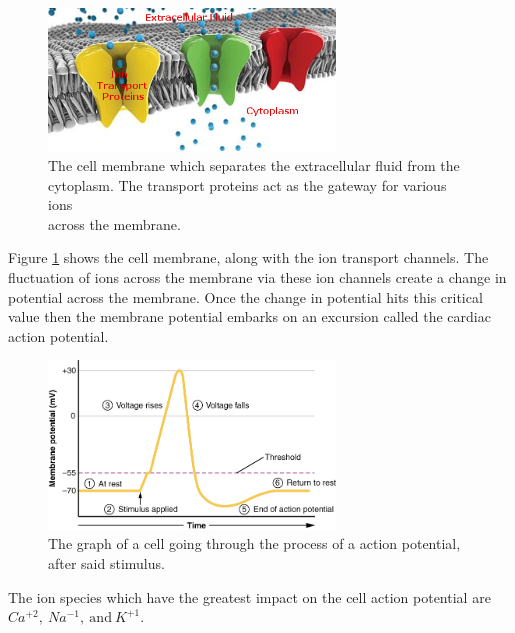\documentclass{bmcart}%
\begin{document}

\begin{figure}[h!]
  \centering
  \includegraphics[width=3in]{CellMembrane.png}
  \caption[Cell Membrane]
   {The cell membrane which separates the extracellular fluid from the\\
   cytoplasm. The transport proteins act as the gateway for various ions\\
   across the membrane. \cite{CellMemPhoto} }
\label{fig:Membrane}
\end{figure}

 Figure \ref{fig:Membrane} shows the cell membrane, along with the ion transport channels. The fluctuation of ions across the membrane via these ion channels create a change in potential across the membrane. Once the change in potential hits this critical value then the membrane potential embarks on an excursion called the cardiac action potential.\cite{Besse2007}
 
 \begin{figure}[h!]
  \centering
  \includegraphics[width=3in]{action_potential}
  \caption[action_potential]
  {The graph of a cell going through the process of a action potential,\\
  after said stimulus. \cite{ActPotImage}}
\label{fig:actionPotential}
\end{figure}
 
 The ion species which have the greatest impact on the cell action potential are \begin{math} Ca^{+2}, \: Na^ {-1}, \: \textrm{and} \: K^{+1} \end{math}.
 
\end{document}
